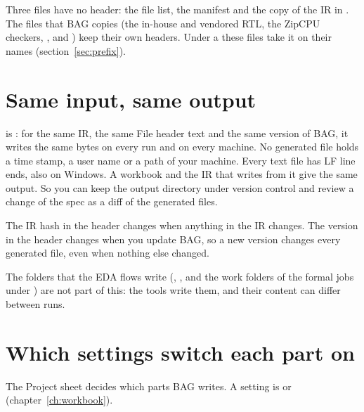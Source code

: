 Three files have no header: the file list, the manifest and the copy of the IR in
. The files that BAG copies (the in-house and vendored RTL, the ZipCPU
checkers, ,  and ) keep their own
headers. Under a  these files take it on their names
(section~\ref{sec:prefix}).

\section{Same input, same output}
\label{sec:deterministic}

 is : for the same IR, the same File header text
and the same version of BAG, it writes the same bytes on every run and on every machine.
No generated file holds a time stamp, a user name or a path of your machine. Every text
file has LF line ends, also on Windows. A workbook and the IR that  writes
from it give the same output. So you can keep the output directory under version
control and review a change of the spec as a diff of the generated files.

The IR hash in the header changes when anything in the IR changes. The version in the
header changes when you update BAG, so a new version changes every generated file, even
when nothing else changed.

The folders that the EDA flows write (, , 
and the work folders of the formal jobs under ) are not part of this: the
tools write them, and their content can differ between runs.

\section{Which settings switch each part on}
\label{sec:switches}

The Project sheet decides which parts BAG writes. A setting is  or 
(chapter~\ref{ch:workbook}).

